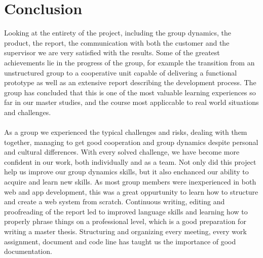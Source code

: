 \newpage
\section{Conclusion} 
Looking at the entirety of the project, including the group dynamics, the product, the report, the communication with both the customer and the supervisor we are very satisfied with the results. Some of the greatest achievements lie in the progress of the group, for example the transition from an unstructured group to a cooperative unit capable of delivering a functional prototype as well as an extensive report describing the development process. The group has concluded that this is one of the most valuable learning experiences so far in our master studies, and the course most appliccable to real world situations and challenges.

\paragraph{} As a group we experienced the typical challenges and risks, dealing with them together, managing to get good cooperation and group dynamics despite personal and cultural differences. With every solved challenge, we have become more confident in our work, both individually and as a team. Not only did this project help us improve our group dynamics skills, but it also enchanced our ability to acquire and learn new skills. As most group members were inexperienced in both web and app development, this was a great oppurtunity to learn how to structure and create a web system from scratch. Continuous writing, editing and proofreading of the report led to improved language skills and learning how to properly phrase things on a professional level, which is a good preparation for writing a master thesis. Structuring and organizing every meeting, every work assignment, document and code line has taught us the importance of good documentation.
